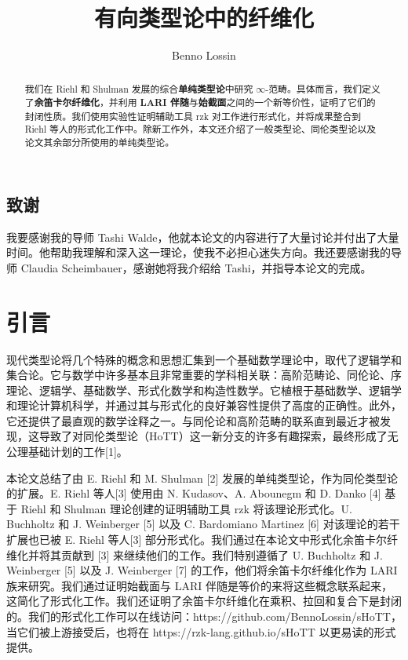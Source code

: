 \documentclass{ctexrep}
\title{有向类型论中的纤维化}
\author{Benno Lossin}
\date{}
\theoremstyle{plain}
\theoremstyle{definition}
\theoremstyle{remark}
\theoremstyle{definition}
\theoremstyle{definition}
\theoremstyle{definition}
\begin{document}
\maketitle

\begin{abstract}
我们在 Riehl 和 Shulman 发展的综合\textbf{单纯类型论}中研究 \(\infty\)-范畴。具体而言，我们定义了\textbf{余笛卡尔纤维化}，并利用 \textbf{LARI 伴随}与\textbf{始截面}之间的一个新等价性，证明了它们的封闭性质。我们使用实验性证明辅助工具 \textsf{rzk} 对工作进行形式化，并将成果整合到 Riehl 等人的形式化工作中。除新工作外，本文还介绍了一般类型论、同伦类型论以及论文其余部分所使用的单纯类型论。
\end{abstract}

\section*{致谢}

我要感谢我的导师 Tashi Walde，他就本论文的内容进行了大量讨论并付出了大量时间。他帮助我理解和深入这一理论，使我不必担心迷失方向。我还要感谢我的导师 Claudia Scheimbauer，感谢她将我介绍给 Tashi，并指导本论文的完成。

\tableofcontents
\clearpage

\chapter{引言}

现代类型论将几个特殊的概念和思想汇集到一个基础数学理论中，取代了逻辑学和集合论。它与数学中许多基本且非常重要的学科相关联：高阶范畴论、同伦论、序理论、逻辑学、基础数学、形式化数学和构造性数学。它植根于基础数学、逻辑学和理论计算机科学，并通过其与形式化的良好兼容性提供了高度的正确性。此外，它还提供了最直观的数学诠释之一。与同伦论和高阶范畴的联系直到最近才被发现，这导致了对同伦类型论（HoTT）这一新分支的许多有趣探索，最终形成了无公理基础计划的工作[1]。

本论文总结了由 E. Riehl 和 M. Shulman [2] 发展的单纯类型论，作为同伦类型论的扩展。E. Riehl 等人[3] 使用由 N. Kudasov、A. Abounegm 和 D. Danko [4] 基于 Riehl 和 Shulman 理论创建的证明辅助工具 \textsf{rzk} 将该理论形式化。U. Buchholtz 和 J. Weinberger [5] 以及 C. Bardomiano Martinez [6] 对该理论的若干扩展也已被 E. Riehl 等人[3] 部分形式化。我们通过在本论文中形式化余笛卡尔纤维化并将其贡献到 [3] 来继续他们的工作。我们特别遵循了 U. Buchholtz 和 J. Weinberger [5] 以及 J. Weinberger [7] 的工作，他们将余笛卡尔纤维化作为 LARI 族来研究。我们通过证明始截面与 LARI 伴随是等价的来将这些概念联系起来，这简化了形式化工作。我们还证明了余笛卡尔纤维化在乘积、拉回和复合下是封闭的。我们的形式化工作可以在线访问：https://github.com/BennoLossin/sHoTT，当它们被上游接受后，也将在 https://rzk-lang.github.io/sHoTT 以更易读的形式提供。
\end{document}
